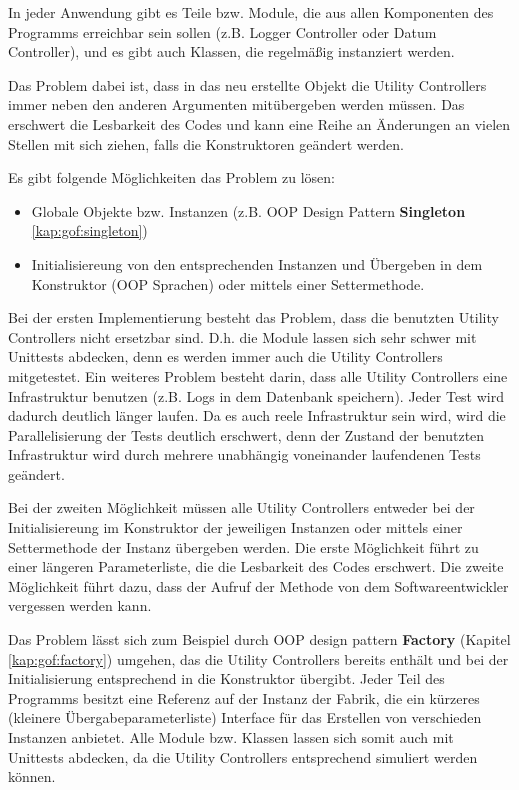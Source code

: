 In jeder Anwendung gibt es Teile bzw. Module, die aus allen Komponenten des Programms erreichbar sein sollen
(z.B. Logger Controller oder Datum Controller), und es gibt auch Klassen, die regelmäßig instanziert werden.

Das Problem dabei ist, dass in das neu erstellte Objekt die Utility Controllers immer neben den anderen Argumenten 
mitübergeben werden müssen. Das erschwert die Lesbarkeit des Codes und kann eine Reihe an Änderungen an vielen Stellen mit sich ziehen,
falls die Konstruktoren geändert werden.

Es gibt folgende Möglichkeiten das Problem zu lösen:
\begin{itemize}
    \item Globale Objekte bzw. Instanzen (z.B. OOP Design Pattern \textbf{Singleton} \ref{kap:gof:singleton})
    \item Initialisiereung von den entsprechenden Instanzen und Übergeben in dem Konstruktor (OOP Sprachen)
    oder mittels einer Settermethode.
\end{itemize}

Bei der ersten Implementierung besteht das Problem, dass die benutzten Utility Controllers nicht ersetzbar sind.
D.h. die Module lassen sich sehr schwer mit Unittests abdecken, denn es werden immer auch die Utility Controllers mitgetestet.
Ein weiteres Problem besteht darin, dass alle Utility Controllers eine Infrastruktur benutzen
(z.B. Logs in dem Datenbank speichern). Jeder Test wird dadurch deutlich länger laufen.
Da es auch reele Infrastruktur sein wird, wird die Parallelisierung der Tests deutlich erschwert, denn 
der Zustand der benutzten Infrastruktur wird durch mehrere unabhängig voneinander laufendenen Tests geändert.

Bei der zweiten Möglichkeit müssen alle Utility Controllers entweder bei der Initialisiereung im Konstruktor 
der jeweiligen Instanzen oder mittels einer Settermethode der Instanz übergeben werden.
Die erste Möglichkeit führt zu einer längeren Parameterliste, die die Lesbarkeit des Codes erschwert.
Die zweite Möglichkeit führt dazu, dass der Aufruf der Methode von dem Softwareentwickler vergessen werden kann.

Das Problem lässt sich zum Beispiel durch OOP design pattern \textbf{Factory} (Kapitel \ref{kap:gof:factory}) umgehen, das die Utility Controllers bereits
enthält und bei der Initialisierung entsprechend in die Konstruktor übergibt. 
Jeder Teil des Programms besitzt eine Referenz auf der Instanz der Fabrik, 
die ein kürzeres (kleinere Übergabeparameterliste) Interface für das Erstellen von verschieden Instanzen anbietet.
Alle Module bzw. Klassen lassen sich somit auch mit Unittests
abdecken, da die Utility Controllers entsprechend simuliert werden können. 

